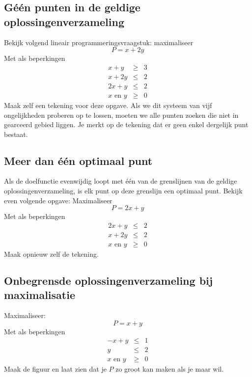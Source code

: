 \subsection{G\'{e}\'{e}n punten in de geldige oplossingenverzameling}
Bekijk volgend lineair programmeringsvraagstuk: maximaliseer
\begin{displaymath}
    P=x+2y
\end{displaymath}
Met als beperkingen
\begin{eqnarray*}
    x+y & \geqslant & 3  \\
    x+2y & \leqslant & 2  \\
    2x+y & \leqslant & 2  \\
    x \mbox{ en } y & \geqslant & 0
\end{eqnarray*}
Maak zelf een tekening voor deze opgave. Als we dit systeem van vijf ongelijkheden proberen op te lossen,
moeten we alle punten zoeken die niet in gearceerd gebied liggen. Je
merkt op de tekening dat er geen enkel dergelijk punt bestaat.



\subsection{Meer dan \'{e}\'{e}n optimaal punt}
Als de doelfunctie evenwijdig loopt met \'{e}\'{e}n van de grenslijnen
van de geldige oplossingenverzameling, is elk punt op deze grenslijn
een optimaal punt. Bekijk even volgende opgave:
Maximaliseer
\begin{displaymath}
    P=2x+y
\end{displaymath}
Met als beperkingen
\begin{eqnarray*}
    2x+y & \leqslant & 2  \\
    x+2y & \leqslant & 2  \\
    x \mbox{ en }y & \geqslant & 0
\end{eqnarray*}
Maak opnieuw zelf de tekening.



\subsection{Onbegrensde oplossingenverzameling bij maximalisatie}
Maximaliseer:
\begin{displaymath}
    P=x+y
\end{displaymath}
Met als beperkingen
\begin{eqnarray*}
    -x+y & \leqslant & 1  \\
    y & \leqslant & 2  \\
    x \mbox{ en } y & \geqslant & 0
\end{eqnarray*}
Maak de figuur en laat zien dat je $P$ zo groot kan maken als je maar wil.


